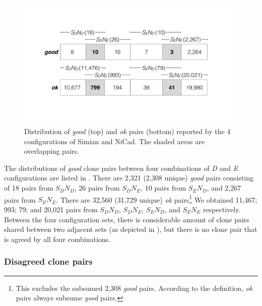 \documentclass[sigconf,review, anonymous]{acmart}
\begin{document}
\begin{figure}
	\centering
	\includegraphics[width=\linewidth]{good-ok_pairs-crop}
	\caption{Distribution of \textit{good} (top) and \textit{ok} pairs (bottom) reported by the 4 configurations of Simian and NiCad. The shaded areas are overlapping pairs.}
	\label{fig:good-ok-pairs}
\end{figure}

The distributions of \textit{good} clone pairs between four combinations of \textit{D} and \textit{E} configurations are listed in . %
There are 2,321 (2,308 unique) \textit{good} pairs consisting of 18 pairs from $S_DN_D$, 26 pairs from $S_DN_E$, 10 pairs from $S_EN_D$, and 2,267 pairs from $S_EN_E$. There are 32,560 (31,729 unique) \textit{ok} pairs\footnote{This excludes the subsumed 2,308 \textit{good} pairs. According to the definition, \textit{ok} pairs always subsume \textit{good} pairs.} We obtained 11,467; 993; 79; and 20,021 pairs from $S_DN_D$, $S_DN_E$, $S_EN_D$, and $S_EN_E$ respectively. Between the four configuration sets, there is considerable amount of clone pairs shared between two adjacent sets (as depicted in ), but there is no clone pair that is agreed by all four combinations. 

\subsubsection{Disagreed clone pairs}
\end{document}
